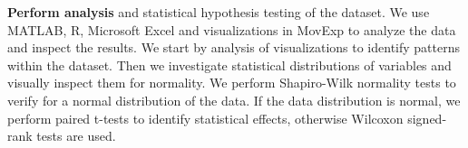 \textbf{Perform analysis} and statistical hypothesis testing of the dataset. We use MATLAB, R, Microsoft Excel and visualizations in MovExp \cite{palmas2014movexp} to analyze the data and inspect the results. We start by analysis of visualizations to identify patterns within the dataset. Then we investigate statistical distributions of variables and visually inspect them for normality. We perform Shapiro-Wilk normality tests to verify for a normal distribution of the data. If the data distribution is normal, we perform paired t-tests to identify statistical effects, otherwise Wilcoxon signed-rank tests are used.